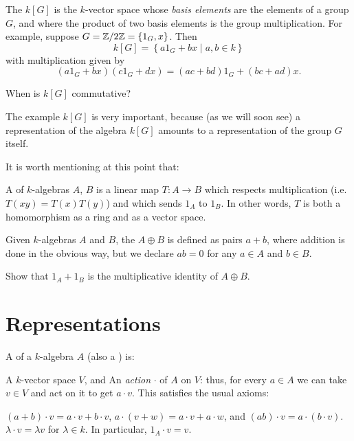 \begin{example}
	The  $k[G]$ is the $k$-vector space
	whose \emph{basis elements} are the elements of a group $G$,
	and where the product of two basis elements is the group multiplication.
	For example, suppose $G = \mathbb Z/2\mathbb Z = \{1_G, x\}$.
	Then
	\[ k[G] = \left\{ a1_G + bx \mid a,b \in k \right\} \]
	with multiplication given by
	\[ (a1_G + bx)(c1_G+dx) = (ac+bd)1_G + (bc+ad)x. \]
\end{example}
\begin{ques}
	When is $k[G]$ commutative?
\end{ques}
The example $k[G]$ is very important,
because (as we will soon see) a representation of the algebra $k[G]$
amounts to a representation of the group $G$ itself.

It is worth mentioning at this point that:
\begin{definition}
	A  of $k$-algebras $A$, $B$ is a
	linear map $T \colon A \to B$ which respects multiplication
	(i.e.\ $T(xy) = T(x)T(y)$) and which sends $1_A$ to $1_B$.
	In other words, $T$ is both a homomorphism as a ring and as a vector space.
\end{definition}
\begin{definition}
	Given $k$-algebras $A$ and $B$, the  $A \oplus B$
	is defined as pairs $a + b$, where addition is done in the obvious way,
	but we declare $ab = 0$ for any $a \in A$ and $b \in B$.
\end{definition}
\begin{ques}
	Show that $1_A + 1_B$ is the multiplicative identity of $A \oplus B$.
\end{ques}

\section{Representations}

\begin{definition}
	A  of a $k$-algebra $A$
	(also a ) is:
	\begin{enumerate}[(i)]
		\ii A $k$-vector space $V$, and
		\ii An \emph{action} $\cdot$ of $A$ on $V$: thus, for every $a \in A$
		we can take $v \in V$ and act on it to get $a \cdot v$.
		This satisfies the usual axioms:
		\begin{itemize}
			\ii $(a+b) \cdot v = a \cdot v + b \cdot v$,
			$a \cdot (v+w) = a \cdot v + a \cdot w$,
			and $(ab) \cdot v = a \cdot (b \cdot v)$.
			\ii $\lambda \cdot v = \lambda v$ for $\lambda \in k$.
			In particular, $1_A \cdot v = v$.
		\end{itemize}
	\end{enumerate}
\end{definition}

